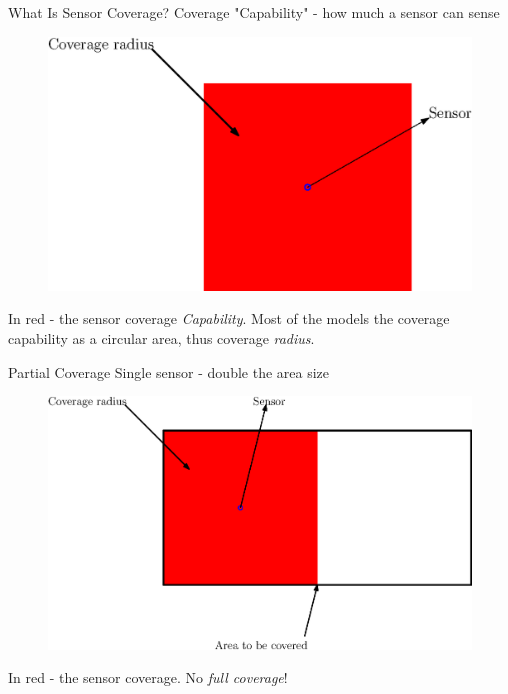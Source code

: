 \documentclass[t]{beamer}
\begin{document}
\begin{frame}[label=motivation3]{What Is Sensor Coverage?}
Coverage "Capability" - how much a sensor can sense

\begin{figure}[b]
\includegraphics[scale=0.5]{motivation/coverage-radius.eps}
\end{figure}

In red - the sensor coverage \emph{Capability}. Most of the models the coverage capability as a circular area, thus coverage \emph{radius}.
\end{frame}
\begin{frame}[label=motivation4]{Partial Coverage}
Single sensor - double the area size

\begin{figure}[b]
\includegraphics[scale=0.5]{motivation/partial-coverage.eps}
\end{figure}
In red - the sensor coverage. No \emph{full coverage}!
\end{frame}
\end{document}
